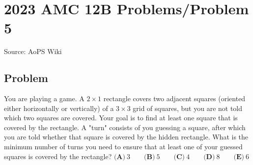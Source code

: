 \documentclass[12pt]{article}
\begin{document}
\section*{{2023 AMC 12B Problems/Problem 5}}
Source: AoPS Wiki

\subsection*{Problem}
You are playing a game. A $2 \times 1$ rectangle covers two adjacent squares (oriented either horizontally or vertically) of a $3 \times 3$ grid of squares, but you are not told which two squares are covered. Your goal is to find at least one square that is covered by the rectangle. A "turn" consists of you guessing a square, after which you are told whether that square is covered by the hidden rectangle. What is the minimum number of turns you need to ensure that at least one of your guessed squares is covered by the rectangle? $\textbf{(A)}~3\qquad\textbf{(B)}~5\qquad\textbf{(C)}~4\qquad\textbf{(D)}~8\qquad\textbf{(E)}~6$
\end{document}
